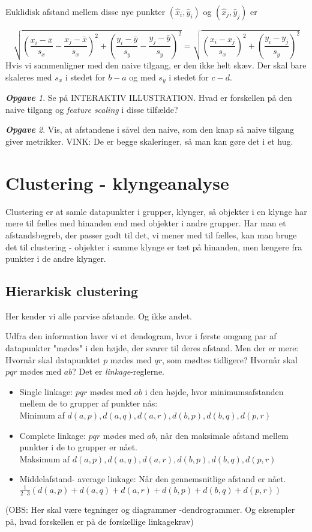 \documentclass[a4paper, 12pt]{article}
\theoremstyle{remark}
\newtheorem{Opgave}{\textbf{Opgave}}
\begin{document}
Euklidisk afstand mellem disse nye punkter $(\hat{x}_i,\hat{y}_i)$ og  $(\hat{x}_j,\hat{y}_j)$ er 

$$\sqrt{\left(\frac{x_i-\bar{x}}{s_x}-\frac{x_j-\bar{x}}{s_x}\right)^2 +\left(\frac{y_i-\bar{y}}{s_y}-\frac{y_j-\bar{y}}{s_y}\right)^2}=\sqrt{\left(\frac{x_i-x_j}{s_x}\right)^2+\left(\frac{y_i-y_j}{s_y}\right)^2}$$
Hvis vi sammenligner med den naive tilgang, er den ikke helt skæv. Der skal bare skaleres med $s_x$ i stedet for $b-a$ og med $s_y$ i stedet for $c-d$.
\begin{Opgave}
Se på INTERAKTIV ILLUSTRATION. Hvad er forskellen på den naive tilgang og \emph{feature scaling} i disse tilfælde? 
\end{Opgave}
\begin{Opgave}
Vis, at afstandene i såvel den naive, som den knap så naive tilgang giver metrikker. VINK: De er begge skaleringer, så man kan gøre det i et hug. 
\end{Opgave}
\section*{Clustering - klyngeanalyse}

Clustering er at samle datapunkter i grupper, klynger, så objekter i en klynge har mere til fælles med hinanden end med objekter i andre grupper. Har man et afstandsbegreb, der passer godt til det, vi mener med til fælles, kan man bruge det til clustering - objekter i samme klynge er tæt på hinanden, men længere fra punkter i de andre klynger. 
\subsection*{Hierarkisk clustering}
Her kender vi alle parvise afstande. Og ikke andet. 

Udfra den information laver vi et dendogram, hvor i første omgang par af datapunkter "mødes"\; i den højde, der svarer til deres afstand. Men der er mere: Hvornår skal datapunktet $p$ mødes med $qr$, som mødtes tidligere? Hvornår skal $pqr$ mødes med $ab$?  Det er \emph{linkage}-reglerne.
\begin{itemize}
\item Single linkage: $pqr$ mødes med $ab$ i den højde, hvor minimumsafstanden mellem de to grupper af punkter nås:\\ Minimum af $d(a,p),d(a,q), d(a,r), d(b,p), d(b,q), d(p,r)$
\item Complete linkage: $pqr$ mødes med $ab$, når den maksimale afstand mellem punkter i de to grupper er nået. \\Maksimum af $d(a,p),d(a,q), d(a,r), d(b,p), d(b,q), d(p,r)$
\item Middelafstand- average linkage: Når den gennemsnitlige afstand er nået. $\frac{1}{2\cdot 3}(d(a,p)+d(a,q)+ d(a,r)+ d(b,p)+ d(b,q)+ d(p,r))$
\end{itemize}
(OBS: Her skal være tegninger og diagrammer -dendrogrammer. Og eksempler på, hvad forskellen er på de forskellige linkagekrav)
\end{document}
